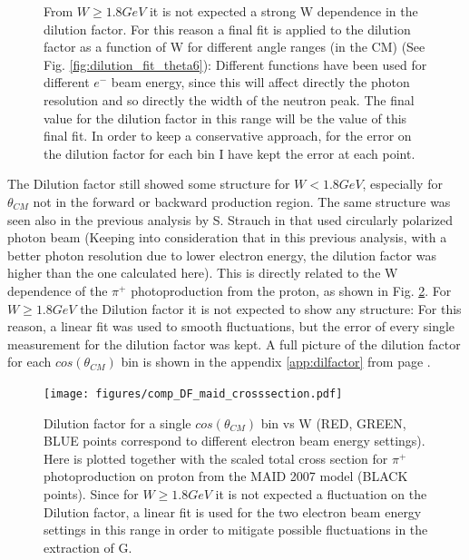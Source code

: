 \begin{figure}[htb]
\begin{center}
{      From $W\geq 1.8 GeV$ it is not expected a strong W dependence in the dilution factor. For this reason a final fit is applied to the dilution factor as a function of W for different angle ranges (in the CM) (See Fig. \ref{fig:dilution_fit_theta6}): Different functions have been used for different $e^-$ beam energy, since this will affect directly the photon resolution and so directly the width of the neutron peak. The final value for the dilution factor in this range will be the value of this final fit. In order to keep a conservative approach, for the error on the dilution factor for each bin I have kept the error at each point. }
    \label{fig:dilution_fit_comp}
  \end{center}
\end{figure}

The Dilution factor still showed some structure for $W < 1.8GeV$, especially for $\theta_{CM}$ not in the forward or backward production region. The same structure was seen also in the previous analysis by S. Strauch in \cite{Strauch_2014} that used circularly polarized photon beam (Keeping into consideration that in this previous analysis, with a better photon resolution due to lower electron energy, the dilution factor was higher than the one calculated here). This is directly related to the W dependence of the $\pi^+$ photoproduction from the proton, as shown in Fig. \ref{fig:comparison_dilutionfactor}. For $W \geq 1.8GeV$ the Dilution factor it is not expected to show any structure: For this reason, a linear fit was used to smooth fluctuations, but the error of every single measurement for the dilution factor was kept. A full picture of the dilution factor for each $cos(\theta_{CM})$ bin is shown in the appendix \ref{app:dilfactor} from page \pageref{app:dilfactor}.  

\begin{figure}[htb]
  \begin{center}
    \texttt{[image: figures/comp\_DF\_maid\_crosssection.pdf]} \\
    \caption{Dilution factor for a single $cos(\theta_{CM})$ bin vs W (RED, GREEN, BLUE points correspond to different electron beam energy settings). Here is plotted together with the scaled total cross section for $\pi^+$ photoproduction on proton from the MAID 2007 model \cite{MAID_2007} (BLACK points). Since for $W \geq 1.8GeV$ it is not expected a fluctuation on the Dilution factor, a linear fit is used for the two electron beam energy settings in this range in order to mitigate possible fluctuations in the extraction of G.}
    \label{fig:comparison_dilutionfactor}
  \end{center}
\end{figure}



